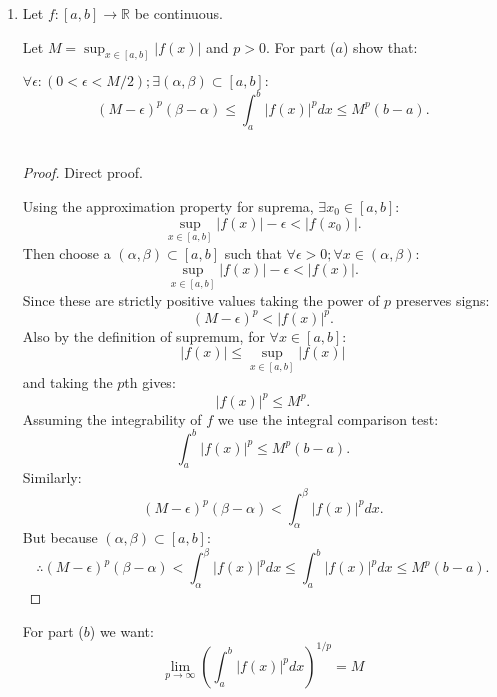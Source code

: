 \begin{enumerate}
\begin{proof}
    Finally $\forall x\in I$:
    \begin{align*}
        f(x)
        &=\sum_{j=1}^{\infty}|c_j|\chi_{J_j}(x) \\
        &=\chi_I(x)+\sum_{j=1}^{\infty} -\chi_{\{q_j\}}(x) \\
        &<\infty
    \end{align*}
    So if $x\in\mathbb{Q}$ then $f(x)=0$, and vice versa.
    
    Therefore our function $f$ is integrable on bounded $I$ with formula:
    $$\int_I f=\lambda(I).$$
    \end{proof}

    \newpage

    \item Let $f:[a,b]\rightarrow\mathbb{R}$ be continuous.

    Let $M=\displaystyle\sup_{x\in[a,b]}|f(x)|$ and $p>0$. For part ($a$) show that:

    $\forall\epsilon:(0<\epsilon<M/2);\exists(\alpha,\beta)\subset[a,b]:$
    $$(M-\epsilon)^p(\beta-\alpha)\leq\int_{a}^{b}|f(x)|^p dx\leq M^p(b-a).$$ \\

    \begin{proof}
    Direct proof.

    Using the approximation property for suprema, $\exists x_0\in[a,b]$:
    $$\sup_{x\in[a,b]}|f(x)|-\epsilon<|f(x_0)|.$$
    Then choose a $(\alpha,\beta)\subset[a,b]$ such that $\forall\epsilon>0; \forall x\in(\alpha,\beta):$
    $$\sup_{x\in[a,b]}|f(x)|-\epsilon<|f(x)|.$$
    Since these are strictly positive values taking the power of $p$ preserves signs:
    $$(M-\epsilon)^p<|f(x)|^p.$$
    Also by the definition of supremum, for $\forall x\in[a,b]:$
    $$|f(x)|\leq\sup_{x\in[a,b]}|f(x)|$$
    and taking the $p$th gives:
    $$|f(x)|^p\leq M^p.$$
    Assuming the integrability of $f$ we use the integral comparison test:
    $$\int_{a}^{b}|f(x)|^p\leq M^p(b-a).$$
    Similarly:
    $$(M-\epsilon)^p(\beta-\alpha)<\int_{\alpha}^{\beta}|f(x)|^pdx.$$
    But because $(\alpha,\beta)\subset[a,b]$:
    $$\therefore(M-\epsilon)^p(\beta-\alpha)<\int_{\alpha}^{\beta}|f(x)|^pdx
    \leq\int_{a}^{b}|f(x)|^pdx\leq M^p(b-a).$$
    \end{proof}

    \newpage

    For part ($b$) we want:
    $$\lim_{p\rightarrow\infty}\left(
    \int_{a}^{b}|f(x)|^p dx\right)^{1/p}=M$$ \\


\end{enumerate}

